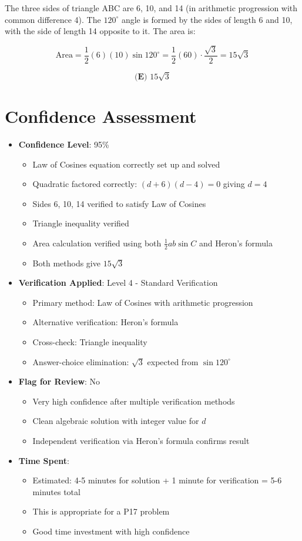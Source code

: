 \documentclass[12pt]{article}
\begin{document}
The three sides of triangle ABC are 6, 10, and 14 (in arithmetic progression with common difference 4). The $120^\circ$ angle is formed by the sides of length 6 and 10, with the side of length 14 opposite to it. The area is:

$$\text{Area} = \frac{1}{2}(6)(10)\sin 120^\circ = \frac{1}{2}(60) \cdot \frac{\sqrt{3}}{2} = 15\sqrt{3}$$

$$\boxed{\textbf{(E) } 15\sqrt{3}}$$

\section*{Confidence Assessment}
\begin{itemize}[leftmargin=*]
    \item \textbf{Confidence Level}: 95\% 
    \begin{itemize}
        \item Law of Cosines equation correctly set up and solved
        \item Quadratic factored correctly: $(d+6)(d-4) = 0$ giving $d = 4$
        \item Sides 6, 10, 14 verified to satisfy Law of Cosines
        \item Triangle inequality verified
        \item Area calculation verified using both $\frac{1}{2}ab\sin C$ and Heron's formula
        \item Both methods give $15\sqrt{3}$
    \end{itemize}
    \item \textbf{Verification Applied}: Level 4 - Standard Verification
    \begin{itemize}
        \item Primary method: Law of Cosines with arithmetic progression
        \item Alternative verification: Heron's formula
        \item Cross-check: Triangle inequality
        \item Answer-choice elimination: $\sqrt{3}$ expected from $\sin 120^\circ$
    \end{itemize}
    \item \textbf{Flag for Review}: No
    \begin{itemize}
        \item Very high confidence after multiple verification methods
        \item Clean algebraic solution with integer value for $d$
        \item Independent verification via Heron's formula confirms result
    \end{itemize}
    \item \textbf{Time Spent}: 
    \begin{itemize}
        \item Estimated: 4-5 minutes for solution + 1 minute for verification = 5-6 minutes total
        \item This is appropriate for a P17 problem
        \item Good time investment with high confidence
    \end{itemize}
\end{itemize}
\end{document}
